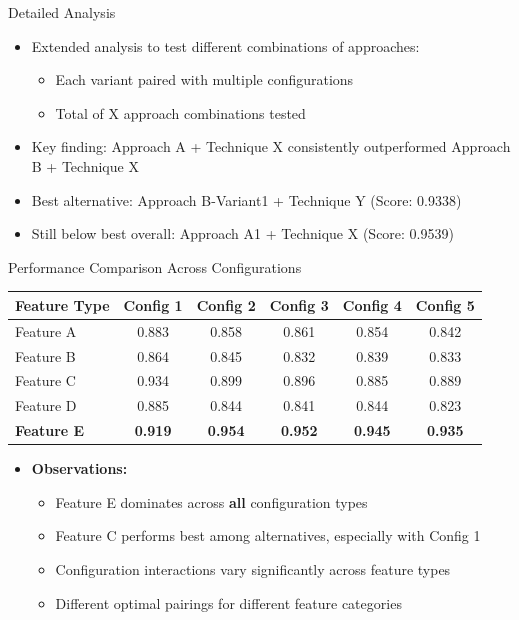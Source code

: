 \documentclass[
    10pt,
    aspectratio=169,
]{beamer}
\begin{document}

\begin{frame}{Detailed Analysis}
\begin{itemize}
    \item Extended analysis to test different combinations of approaches:
    \begin{itemize}
        \item Each variant paired with multiple configurations
        \item Total of X approach combinations tested
    \end{itemize}
    \item Key finding: Approach A + Technique X consistently outperformed Approach B + Technique X
    \item Best alternative: Approach B-Variant1 + Technique Y (Score: 0.9338)
    \item Still below best overall: Approach A1 + Technique X (Score: 0.9539)
\end{itemize}
\end{frame}

\begin{frame}{Performance Comparison Across Configurations}
\begin{table}[]
\centering
\small
\begin{tabular}{|l|c|c|c|c|c|}
\hline
\textbf{Feature Type} & \textbf{Config 1} & \textbf{Config 2} & \textbf{Config 3} & \textbf{Config 4} & \textbf{Config 5} \\ \hline
Feature A & 0.883 & 0.858 & 0.861 & 0.854 & 0.842 \\ \hline
Feature B & 0.864 & 0.845 & 0.832 & 0.839 & 0.833 \\ \hline
Feature C & \cellcolor[HTML]{90EE90}0.934 & 0.899 & 0.896 & 0.885 & 0.889 \\ \hline
Feature D & 0.885 & 0.844 & 0.841 & 0.844 & 0.823 \\ \hline
\rowcolor[HTML]{FFD700}
\textbf{Feature E} & \textbf{0.919} & \textbf{0.954} & \textbf{0.952} & \textbf{0.945} & \textbf{0.935} \\ \hline
\end{tabular}
\end{table}
\vspace{0.2cm}
\begin{itemize}
    \item \textbf{Observations:}
    \begin{itemize}
        \item Feature E dominates across \textbf{all} configuration types
        \item Feature C performs best among alternatives, especially with Config 1
        \item Configuration interactions vary significantly across feature types
        \item Different optimal pairings for different feature categories
    \end{itemize}
\end{itemize}
\end{frame}
\end{document}
